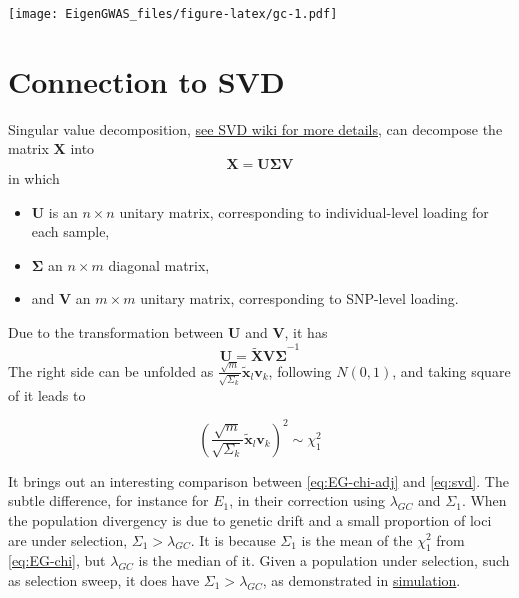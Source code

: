 \documentclass[]{book}
\begin{document}
\texttt{[image: EigenGWAS\_files/figure-latex/gc-1.pdf]}

\hypertarget{connection-to-svd}{%
\section{Connection to SVD}\label{connection-to-svd}}

Singular value decomposition,
\href{https://en.wikipedia.org/wiki/Singular_value_decomposition}{see
SVD wiki for more details}, can decompose the matrix \(\mathbf{X}\) into
\begin{equation}
\mathbf{X}=\mathbf{U\Sigma V} \label{eq:SVD}
\end{equation} in which

\begin{itemize}
\item
  \(\mathbf{U}\) is an \(n\times n\) unitary matrix, corresponding to
  individual-level loading for each sample,
\item
  \(\mathbf{\Sigma}\) an \(n\times m\) diagonal matrix,
\item
  and \(\mathbf{V}\) an \(m\times m\) unitary matrix, corresponding to
  SNP-level loading.
\end{itemize}

Due to the transformation between \(\mathbf{U}\) and \(\mathbf{V}\), it
has \begin{equation}
\mathbf{U}=\mathbf{\tilde{X}V\Sigma}^{-1} \label{eq:svd}
\end{equation} The right side can be unfolded as
\(\frac{\sqrt{m}}{\sqrt{\Sigma_k}}\mathbf{\tilde{x}}_l\mathbf{v}_k\),
following \(N(0,1)\), and taking square of it leads to

\begin{equation}
(\frac{\sqrt{m}}{\sqrt{\Sigma_k}}\mathbf{\tilde{x}}_l\mathbf{v}_k)^2 \sim \chi^2_1 \label{eq:chi-svd}
\end{equation}

It brings out an interesting comparison between \eqref{eq:EG-chi-adj} and
\eqref{eq:svd}. The subtle difference, for instance for \(E_1\), in their
correction using \(\lambda_{GC}\) and \(\Sigma_1\). When the population
divergency is due to genetic drift and a small proportion of loci are
under selection, \(\Sigma_1 \gt \lambda_{GC}\). It is because
\(\Sigma_1\) is the mean of the \(\chi^2_1\) from \eqref{eq:EG-chi}, but
\(\lambda_{GC}\) is the median of it. Given a population under
selection, such as selection sweep, it does have
\(\Sigma_1 \gt \lambda_{GC}\), as demonstrated in
\href{http://rpubs.com/gc5k/EigenGWAScore}{simulation}.
\end{document}
